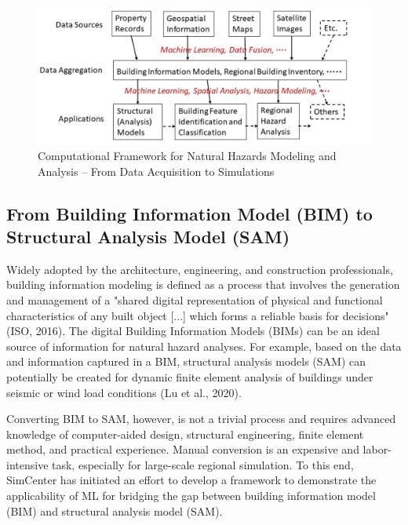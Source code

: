 \begin{figure}[htb]
    \centering
    \includegraphics[width=1.0\textwidth, angle = 0]{Figures/AI_NHE_Computational_Framework.png}
    \caption{Computational Framework for Natural Hazards Modeling and Analysis – From Data Acquisition to Simulations}
    \label{fig:AI_NHE_Computational_Framework}
\end{figure}

\subsection{From Building Information Model (BIM) to Structural Analysis Model (SAM)}

Widely adopted by the architecture, engineering, and construction professionals, building information modeling is defined as a process that involves the generation and management of a "shared digital representation of physical and functional characteristics of any built object [...] which forms a reliable basis for decisions" (ISO, 2016). The digital Building Information Models (BIMs) can be an ideal source of information for natural hazard analyses. For example, based on the data and information captured in a BIM, structural analysis models (SAM) can potentially be created for dynamic finite element analysis of buildings under seismic or wind load conditions (Lu et al., 2020). 

Converting BIM to SAM, however, is not a trivial process and requires advanced knowledge of computer-aided design, structural engineering, finite element method, and practical experience. Manual conversion is an expensive and labor-intensive task, especially for large-scale regional simulation. To this end, SimCenter has initiated an effort to develop a framework to demonstrate the applicability of ML for bridging the gap between building information model (BIM) and structural analysis model (SAM).

